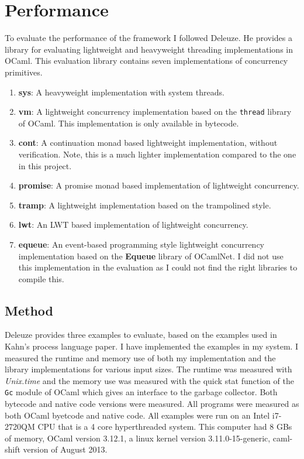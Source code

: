\documentclass[12pt,twoside,notitlepage]{report}
\begin{document}
\section{Performance}
\label{sec:performance_eval}
To evaluate the performance of the framework I followed Deleuze\cite{deleuzelight}. He provides a library for evaluating lightweight and heavyweight threading implementations in OCaml. This evaluation library contains seven implementations of concurrency primitives.
\begin{enumerate}
\item{\textbf{sys}: A heavyweight implementation with system threads.}
\item{\textbf{vm}: A lightweight concurrency implementation based on the \verb|thread| library of OCaml. This implementation is only available in bytecode.}
\item{\textbf{cont}: A continuation monad based lightweight implementation\cite[p.~12-13]{deleuzelight}, without verification. Note, this is a much lighter implementation compared to the one in this project.}
\item{\textbf{promise}: A promise monad based implementation of lightweight concurrency\cite[p.~13-15]{deleuzelight}.}
\item{\textbf{tramp}: A lightweight implementation based on the trampolined style\cite[p.~11-12]{deleuzelight}.}
\item{\textbf{lwt}: An LWT\cite{LWT} based implementation of lightweight concurrency.}
\item{\textbf{equeue}: An event-based programming style lightweight concurrency implementation\cite[p.~15-18]{deleuzelight} based on the \textbf{Equeue} library of OCamlNet. I did not use this implementation in the evaluation as I could not find the right libraries to compile this.}
\end{enumerate}
\subsection{Method}
Deleuze provides three examples to evaluate, based on the examples used in Kahn's process language paper\cite{kahn1976coroutines}. I have implemented the examples in my system. I measured the runtime and memory use of both my implementation and the library implementations for various input sizes. The runtime was measured with \textit{Unix.time} and the memory use was measured with the quick stat function of the \verb|Gc| module of OCaml which gives an interface to the garbage collector. Both bytecode and native code versions were measured. All programs were measured as both OCaml byetcode and native code. All examples were run on an Intel i7-2720QM CPU that is a 4 core hyperthreaded system. This computer had 8 GBs of memory, OCaml version 3.12.1, a linux kernel version 3.11.0-15-generic, caml-shift version of August 2013.
\end{document}

